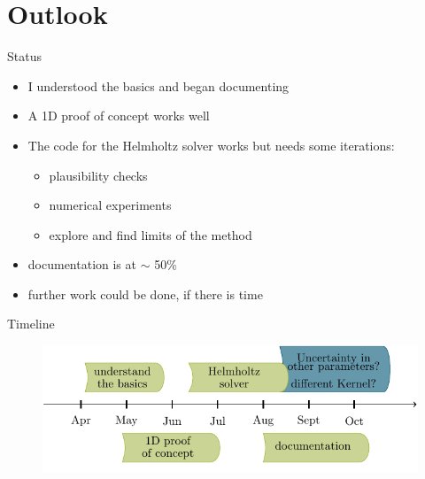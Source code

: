 \documentclass[fleqn,11pt,aspectratio=43]{beamer}
\begin{document}
\part{Outlook}
\begin{frame}[plain]
  \partpage
\end{frame}

\begin{frame}{Status}

\begin{itemize}
\item I understood the basics and began documenting
\item A 1D proof of concept works well
\item The code for the Helmholtz solver works but needs some iterations:
	\begin{itemize}
	\item plausibility checks
	\item numerical experiments
	\item explore and find limits of the method
	\end{itemize}
\item documentation is at $\sim$ 50\%
\item further work could be done, if there is time
\end{itemize}

	\end{frame}



\begin{frame}{Timeline}

      	\begin{figure}[h]
		\begin{center}
		\includegraphics[width=1\textwidth]{timeline}
		\end{center}
		\end{figure}

	\end{frame}
\end{document}
